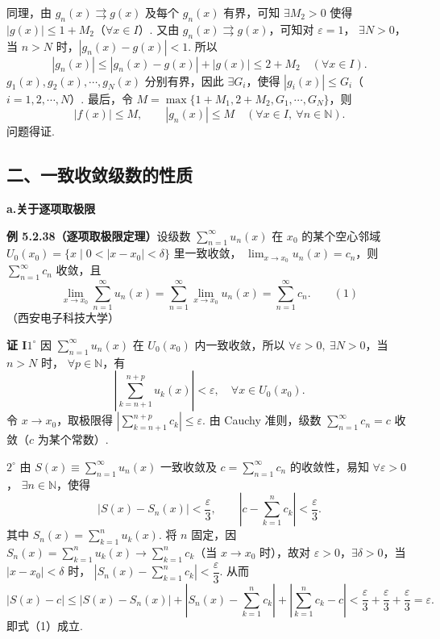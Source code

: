 \documentclass[UTF8,12pt,a4paper,fontset=fandol]{ctexart}
\begin{document}
同理，由 $g_n(x)\rightrightarrows g(x)$ 及每个 $g_n(x)$ 有界，可知
$\exists M_2>0$ 使得 $|g(x)|\le1+M_2$（$\forall x\in I$）. 又由
$g_n(x)\rightrightarrows g(x)$，可知对 $\varepsilon=1$，
$\exists N>0$，当 $n>N$ 时，$|g_n(x)-g(x)|<1$. 所以
\[
  |g_n(x)|\le |g_n(x)-g(x)|+|g(x)|\le2+M_2\quad(\forall x\in I).
\]
$g_1(x),g_2(x),\cdots,g_N(x)$ 分别有界，因此 $\exists G_i$，使得
$|g_i(x)|\le G_i$（$i=1,2,\cdots,N$）. 最后，令
$M=\max\{1+M_1,2+M_2,G_1,\cdots,G_N\}$，则
\[
  |f(x)|\le M,\qquad |g_n(x)|\le M\quad(\forall x\in I,\ \forall n\in\mathbb N).
\]
问题得证.

\subsection*{二、一致收敛级数的性质}

\noindent\textbf{a.\quad 关于逐项取极限}

\noindent\textbf{例 5.2.38（逐项取极限定理）}\quad 设级数
$\displaystyle\sum_{n=1}^{\infty}u_n(x)$ 在 $x_0$ 的某个空心邻域
$U_0(x_0)=\{x\mid0<|x-x_0|<\delta\}$ 里一致收敛，
$\displaystyle\lim_{x\to x_0}u_n(x)=c_n$，则
$\displaystyle\sum_{n=1}^{\infty}c_n$ 收敛，且
\[
  \lim_{x\to x_0}\sum_{n=1}^{\infty}u_n(x)
  =\sum_{n=1}^{\infty}\lim_{x\to x_0}u_n(x)
  =\sum_{n=1}^{\infty}c_n.
\qquad(1)
\]
（西安电子科技大学）

\noindent\textbf{证 I}\quad $1^\circ$ 因 $\displaystyle\sum_{n=1}^{\infty}u_n(x)$ 在
$U_0(x_0)$ 内一致收敛，所以 $\forall\varepsilon>0,\ \exists N>0$，当 $n>N$ 时，
$\forall p\in\mathbb N$，有
\[
  \left|\sum_{k=n+1}^{n+p}u_k(x)\right|<\varepsilon,\quad \forall x\in U_0(x_0).
\]
令 $x\to x_0$，取极限得
$\left|\displaystyle\sum_{k=n+1}^{n+p}c_k\right|\le\varepsilon$. 由 Cauchy 准则，级数
$\displaystyle\sum_{n=1}^{\infty}c_n=c$ 收敛（$c$ 为某个常数）.

$2^\circ$ 由 $S(x)\equiv\displaystyle\sum_{n=1}^{\infty}u_n(x)$ 一致收敛及
$c=\displaystyle\sum_{n=1}^{\infty}c_n$ 的收敛性，易知 $\forall\varepsilon>0$，
$\exists n\in\mathbb N$，使得
\[
  |S(x)-S_n(x)|<\frac\varepsilon3,\qquad
  \left|c-\sum_{k=1}^{n}c_k\right|<\frac\varepsilon3.
\]
其中 $S_n(x)=\displaystyle\sum_{k=1}^{n}u_k(x)$. 将 $n$ 固定，因
$S_n(x)=\displaystyle\sum_{k=1}^{n}u_k(x)\to\displaystyle\sum_{k=1}^{n}c_k$（当
$x\to x_0$ 时），故对 $\varepsilon>0$，$\exists\delta>0$，当
$|x-x_0|<\delta$ 时，
$\left|S_n(x)-\displaystyle\sum_{k=1}^{n}c_k\right|<\dfrac\varepsilon3$. 从而
\[
  |S(x)-c|
  \le |S(x)-S_n(x)|
  +\left|S_n(x)-\sum_{k=1}^{n}c_k\right|
  +\left|\sum_{k=1}^{n}c_k-c\right|
  <\frac\varepsilon3+\frac\varepsilon3+\frac\varepsilon3=\varepsilon.
\]
即式（1）成立.
\end{document}
